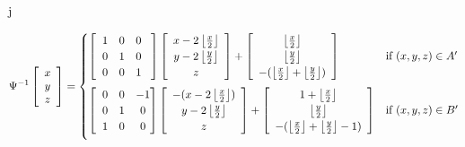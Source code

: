 j\documentclass[]{article}
\begin{document}
\begin{equation}
	\Psi^{-1}\left[\begin{array}{c}
		x\\y\\z
	\end{array}\right] 
	= 
	\begin{cases}
		\left[ \hspace{2mm} \begin{matrix}
			1 & 0 & 0 \\
			0 & 1 & 0 \\
			0 & 0 & 1
		\end{matrix}\hspace{3mm}\right]
	
		\left[\begin{array}{c}
		x - 2\left\lfloor \frac{x}{2} \right\rfloor
		\\ y- 2\left\lfloor \frac{y}{2} \right\rfloor
		\\ z
		\end{array} \right]
		+
		\left[\begin{array}{c}
			\left\lfloor \frac{x}{2} \right\rfloor
			\\ \left\lfloor \frac{y}{2} \right\rfloor
			\\ -(\left\lfloor \frac{x}{2} \right\rfloor + \left\lfloor \frac{y}{2} \right\rfloor )
		\end{array} \right]
			& \text{if } (x,y,z)\in A'	\vspace{2mm}
		\\
		\left[ \hspace{2mm} \begin{matrix}
			0 & 0 & -1 \\
			0 & 1 & 0 \\
			1 & 0 & 0
		\end{matrix}\hspace{0mm}\right]
	
		\left[\begin{array}{c}
		-(x - 2\left\lfloor \frac{x}{2} \right\rfloor)
		\\ y- 2\left\lfloor \frac{y}{2} \right\rfloor
		\\ z
		\end{array} \right]
		+
		\left[\begin{array}{c}
			1+\left\lfloor \frac{x}{2} \right\rfloor
			\\ \left\lfloor \frac{y}{2} \right\rfloor
			\\ -(\left\lfloor \frac{x}{2} \right\rfloor + \left\lfloor \frac{y}{2} \right\rfloor -1)
		\end{array} \right]
			& \text{if } (x,y,z)\in B'	\vspace{2mm}


\end{cases}
\end{equation}
\end{document}
